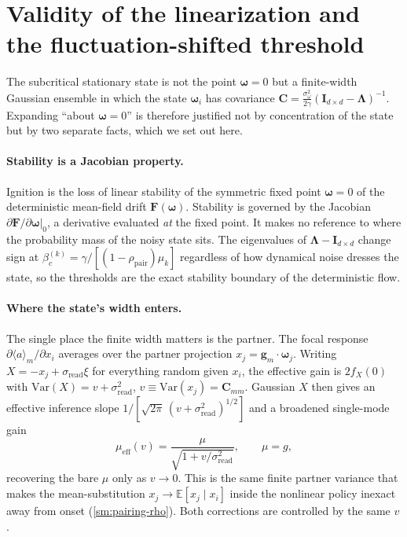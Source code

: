 \documentclass[
  aps,prx,
  preprint,
  superscriptaddress,
  nofootinbib
]{revtex4-2}
\newcommand{\w}{\bm{\omega}}
\newcommand{\g}{\mathbf{g}}
\newcommand{\C}{\mathbf{C}}
\newcommand{\Lam}{\bm{\Lambda}}
\newcommand{\Id}{\mathbf{I}}
\newcommand{\sread}{\sigma_{\mathrm{read}}}
\newcommand{\sidn}{\sigma_{\omega}}
\newcommand{\gain}{g}
\begin{document}
\section{Validity of the linearization and the fluctuation-shifted threshold}\label{sm:linvalidity}

\noindent The subcritical stationary state is not the point $\w=0$ but a finite-width Gaussian ensemble in which the state $\w_i$ has covariance $\C=\tfrac{\sidn^2}{2\gamma}(\Id_{d\times d}-\Lam)^{-1}$. Expanding ``about $\w=0$'' is therefore justified not by concentration of the state but by two separate facts, which we set out here.

\paragraph{Stability is a Jacobian property.} Ignition is the loss of linear stability of the symmetric fixed point $\w=0$ of the deterministic mean-field drift $\mathbf F(\w)$. Stability is governed by the Jacobian $\partial\mathbf F/\partial\w|_{0}$, a derivative evaluated \emph{at} the fixed point. It makes no reference to where the probability mass of the noisy state sits. The eigenvalues of $\Lam-\Id_{d\times d}$ change sign at $\beta_c^{(k)}=\gamma/[(1-\rho_{\mathrm{pair}})\mu_k]$ regardless of how dynamical noise dresses the state, so the thresholds are the exact stability boundary of the deterministic flow.

\paragraph{Where the state's width enters.} The single place the finite width matters is the partner. The focal response $\partial\langle a\rangle_m/\partial x_i$ averages over the partner projection $x_j=\g_m\cdot\w_j$. Writing $X=-x_j+\sread\xi$ for everything random given $x_i$, the effective gain is $2f_X(0)$ with $\mathrm{Var}(X)=v+\sread^2$, $v\equiv\mathrm{Var}(x_j)=\C_{mm}$. Gaussian $X$ then gives an effective inference slope $1/[\sqrt{2\pi}\,(v+\sread^2)^{1/2}]$ and a broadened single-mode gain
\begin{equation}\label{SM-eq:sm-mueff}
\mu_{\mathrm{eff}}(v)=\frac{\mu}{\sqrt{1+v/\sread^2}},\qquad \mu=\gain,
\end{equation}
recovering the bare $\mu$ only as $v\to0$. This is the same finite partner variance that makes the mean-substitution $x_j\to\mathbb E[x_j\mid x_i]$ inside the nonlinear policy inexact away from onset (\cref{sm:pairing-rho}). Both corrections are controlled by the same $v$.
\end{document}
